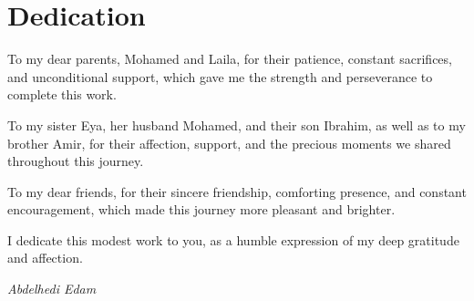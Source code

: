 \chapter*{Dedication}
\thispagestyle{empty}

\begin{center}
\Large
\itshape

To my dear parents, Mohamed and Laila, for their patience, constant sacrifices, and unconditional support, which gave me the strength and perseverance to complete this work.

\vspace{0.9cm}

To my sister Eya, her husband Mohamed, and their son Ibrahim, as well as to my brother Amir, for their affection, support, and the precious moments we shared throughout this journey.

\vspace{0.9cm}

To my dear friends, for their sincere friendship, comforting presence, and constant encouragement, which made this journey more pleasant and brighter.

\vspace{0.9cm}

I dedicate this modest work to you, as a humble expression of my deep gratitude and affection.

\end{center}

\vfill

\begin{flushright}
\Large
\itshape
Abdelhedi Edam
\end{flushright}